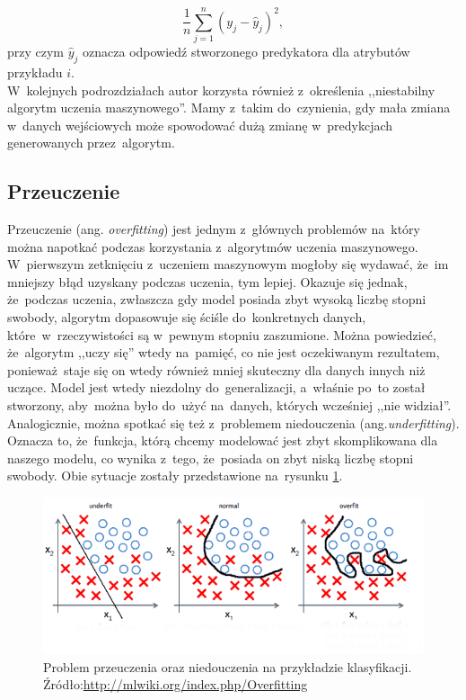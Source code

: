 \begin{equation}
\frac{1}{n} \sum_{j=1}^{n}(y_j - \hat{y}_j)^{2}, 
\end{equation}
przy czym $\hat{y}_j$ oznacza odpowiedź stworzonego predykatora dla atrybutów przykładu $i$.\\
W~kolejnych podrozdziałach autor korzysta również z~określenia ,,niestabilny algorytm uczenia maszynowego''. Mamy z~takim do~czynienia, gdy mała zmiana w~danych wejściowych może spowodować dużą zmianę w~predykcjach generowanych przez~algorytm\cite{ensemble}.

\subsection{Przeuczenie}\label{overfitting_section}
Przeuczenie (ang. \textit{overfitting}) jest jednym z~głównych problemów na~który można napotkać podczas korzystania z~algorytmów uczenia maszynowego. W~pierwszym zetknięciu z~uczeniem maszynowym mogłoby się wydawać, że~im mniejszy błąd uzyskany podczas uczenia, tym lepiej. Okazuje się jednak, że~podczas uczenia, zwłaszcza gdy model posiada zbyt wysoką liczbę stopni swobody, algorytm dopasowuje się ściśle do~konkretnych danych, które~w~rzeczywistości są w~pewnym stopniu zaszumione. Można powiedzieć, że~algorytm ,,uczy się'' wtedy na~pamięć, co nie jest oczekiwanym rezultatem, ponieważ~staje się on wtedy również mniej skuteczny dla danych innych niż uczące.  Model jest wtedy niezdolny do~generalizacji, a~właśnie po~to został stworzony, aby~można było do~użyć na~danych, których wcześniej ,,nie widział''. Analogicznie, można spotkać się też z~problemem niedouczenia (ang.\textit{underfitting}). Oznacza to, że~funkcja, którą chcemy modelować jest zbyt skomplikowana dla naszego modelu, co wynika z~tego, że~posiada on zbyt niską liczbę stopni swobody. Obie sytuacje zostały przedstawione na~rysunku \ref{overfitting}.

\begin{figure}[ht!]
\centering
\includegraphics[scale=0.8]{res/overfitting.png}
\caption[Caption for LOF]{Problem przeuczenia oraz niedouczenia na przykładzie klasyfikacji. Źródło:\url{http://mlwiki.org/index.php/Overfitting}\label{overfitting}} 
\end{figure}

